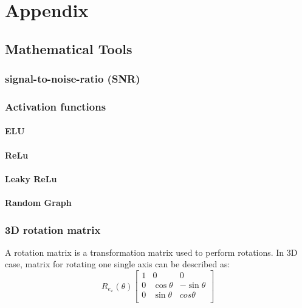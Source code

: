 \chapter{Appendix}

\section{Mathematical Tools}

\subsection{signal-to-noise-ratio (SNR)}

\subsection{Activation functions}
\subsubsection{ELU}
\subsubsection{ReLu}
\subsubsection{Leaky ReLu}

\subsubsection{Random Graph}


\subsection{3D rotation matrix}
\label{app:3DrotationMatrix}
A rotation matrix is a transformation matrix used to perform rotations.
In 3D case, matrix for rotating one single axis can be described as:
\begin{equation}
    R_{e_x} (\theta)
    \begin{bmatrix}
        1 & 0 & 0\\
        0 & \cos \theta & - \sin \theta \\
        0 & \sin \theta & cos \theta \\
    \end{bmatrix}
\end{equation}

